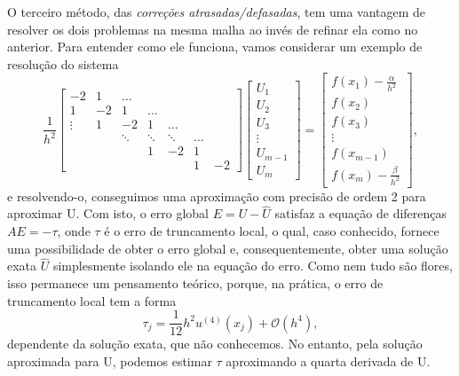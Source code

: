 \documentclass[../differential_methods.tex]{subfiles}
\begin{document}
O terceiro método, das \textit{correções atrasadas/defasadas}, tem uma vantagem de resolver os dois problemas na mesma malha ao invés de refinar ela como no anterior. Para entender como ele funciona, vamos considerar um exemplo de resolução do sistema
\[
	\frac{1}{h^{2}}\begin{bmatrix}
		-2     & 1  & \dotsc &        &        &             \\
		1      & -2 & 1      & \dotsc &        &             \\
		\vdots & 1  & -2     & 1      & \dotsc &             \\
		       &    & \ddots & \ddots & \ddots & \dotsc &    \\
		       &    &        & 1      & -2     & 1           \\
		       &    &        &        &        & 1      & -2
	\end{bmatrix} \begin{bmatrix}
		U_{1}   \\
		U_{2}   \\
		U_{3}   \\
		\vdots  \\
		U_{m-1} \\
		U_{m}
	\end{bmatrix} = \begin{bmatrix}
		f(x_1)-\frac{\alpha }{h^{2}} \\
		f(x_{2})                     \\
		f(x_{3})                     \\
		\vdots                       \\
		f(x_{m-1})                   \\
		f(x_{m})- \frac{\beta }{h^{2}}
	\end{bmatrix},
\]
e resolvendo-o, conseguimos uma aproximação com precisão de ordem 2 para aproximar U. Com isto, o erro global \(E = U - \hat{U}\) satisfaz a equação de diferenças \(AE=-\tau \), onde \(\tau \) é o erro de truncamento local, o qual, caso conhecido, fornece uma possibilidade de obter o erro global e, consequentemente, obter uma solução exata \(\hat{U}\) simplesmente isolando ele na equação do erro. Como nem tudo são flores, isso permanece um pensamento teórico, porque, na prática, o erro de truncamento local tem a forma
\[
	\tau_{j}=\frac{1}{12}h^{2}u^{(4)}(x_{j})+\mathcal{O}(h^{4}),
\]
dependente da solução exata, que não conhecemos. No entanto, pela solução aproximada para U, podemos estimar \(\tau \) aproximando a quarta derivada de U.
\end{document}
